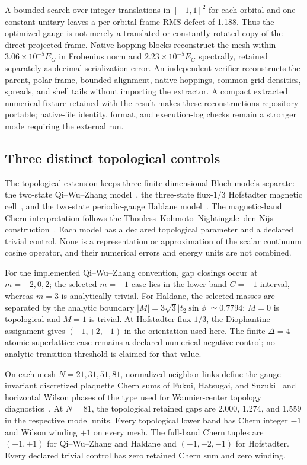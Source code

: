 A bounded search over integer translations in $[-1,1]^2$ for each orbital and
one constant unitary leaves a per-orbital frame RMS defect of 1.188. Thus the
optimized gauge is not merely a translated or constantly rotated copy of the
direct projected frame. Native hopping blocks reconstruct the mesh within
$3.06\times10^{-5}E_G$ in Frobenius norm and $2.23\times10^{-5}E_G$
spectrally, retained separately as decimal serialization error. An independent
verifier reconstructs the parent, polar frame, bounded alignment, native
hoppings, common-grid densities, spreads, and shell tails without importing the
extractor. A compact extracted numerical fixture retained with the result makes
these reconstructions repository-portable; native-file identity, format, and
execution-log checks remain a stronger mode requiring the external run.

\subsection{Three distinct topological controls}

The topological extension keeps three finite-dimensional Bloch models separate:
the two-state Qi--Wu--Zhang model~\cite{qiWuZhang2006}, the three-state
flux-$1/3$ Hofstadter magnetic cell~\cite{hofstadter1976}, and the two-state
periodic-gauge Haldane model~\cite{haldane1988}. The magnetic-band Chern
interpretation follows the Thouless--Kohmoto--Nightingale--den Nijs
construction~\cite{thoulessKohmotoNightingaleDenNijs1982}. Each model has a
declared topological parameter and a declared trivial control. None is a
representation or approximation of the scalar continuum cosine operator, and
their numerical errors and energy units are not combined.

For the implemented Qi--Wu--Zhang convention, gap closings occur at
$m=-2,0,2$; the selected $m=-1$ case lies in the lower-band $C=-1$ interval,
whereas $m=3$ is analytically trivial. For Haldane, the selected masses are
separated by the analytic boundary
$|M|=3\sqrt{3}|t_2\sin\phi|\simeq0.7794$: $M=0$ is topological and $M=1$ is
trivial. At Hofstadter flux $1/3$, the Diophantine assignment gives
$(-1,+2,-1)$ in the orientation used here. The finite $\Delta=4$
atomic-superlattice case remains a declared numerical negative control; no
analytic transition threshold is claimed for that value.

On each mesh $N=21,31,51,81$, normalized neighbor links define the
gauge-invariant discretized plaquette Chern sums of Fukui, Hatsugai, and
Suzuki~\cite{fukui2005} and horizontal Wilson phases of the type used for
Wannier-center topology diagnostics~\cite{soluyanov2011}. At $N=81$, the
topological retained gaps are
2.000, 1.274, and 1.559 in the respective model units. Every topological lower
band has Chern integer $-1$ and Wilson winding $+1$ on every mesh. The full-band
Chern tuples are $(-1,+1)$ for Qi--Wu--Zhang and Haldane and
$(-1,+2,-1)$ for Hofstadter. Every declared trivial control has zero retained
Chern sum and zero winding.

